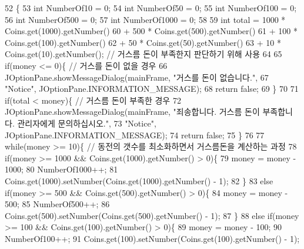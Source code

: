 \begin{DoxyCode}
52                                            \{
53         \textcolor{keywordtype}{int} NumberOf10 = 0;
54         \textcolor{keywordtype}{int} NumberOf50 = 0;
55         \textcolor{keywordtype}{int} NumberOf100 = 0;
56         \textcolor{keywordtype}{int} NumberOf500 = 0;
57         \textcolor{keywordtype}{int} NumberOf1000 = 0;
58         
59         \textcolor{keywordtype}{int} total = 1000 * Coins.get(1000).getNumber()
60                     + 500 * Coins.get(500).getNumber()
61                     + 100 * Coins.get(100).getNumber()
62                     + 50 * Coins.get(50).getNumber()
63                     + 10 * Coins.get(10).getNumber();  \textcolor{comment}{// 거스름 돈이 부족한지 판단하기 위해 사용}
64         
65         \textcolor{keywordflow}{if}(money <= 0)\{  \textcolor{comment}{// 거스를 돈이 없을 경우}
66             JOptionPane.showMessageDialog(mainFrame, \textcolor{stringliteral}{"거스를 돈이 없습니다."},
67                     \textcolor{stringliteral}{"Notice"}, JOptionPane.INFORMATION\_MESSAGE);
68             \textcolor{keywordflow}{return} \textcolor{keyword}{false};
69         \}
70         
71         \textcolor{keywordflow}{if}(total < money)\{  \textcolor{comment}{// 거스름 돈이 부족한 경우}
72             JOptionPane.showMessageDialog(mainFrame, \textcolor{stringliteral}{"죄송합니다. 거스름 돈이 부족합니다. 관리자에게 문의하십시오."},
73                     \textcolor{stringliteral}{"Notice"}, JOptionPane.INFORMATION\_MESSAGE);
74             \textcolor{keywordflow}{return} \textcolor{keyword}{false};
75         \}
76         
77         \textcolor{keywordflow}{while}(money >= 10)\{  \textcolor{comment}{// 동전의 갯수를 최소화하면서 거스름돈을 계산하는 과정}
78             \textcolor{keywordflow}{if}(money >= 1000 && Coins.get(1000).getNumber() > 0)\{
79                 money = money - 1000;
80                 NumberOf1000++;
81                 Coins.get(1000).setNumber(Coins.get(1000).getNumber() - 1);
82             \}
83             \textcolor{keywordflow}{else} \textcolor{keywordflow}{if}(money >= 500 && Coins.get(500).getNumber() > 0)\{
84                 money = money - 500;
85                 NumberOf500++;
86                 Coins.get(500).setNumber(Coins.get(500).getNumber() - 1);
87             \}
88             \textcolor{keywordflow}{else} \textcolor{keywordflow}{if}(money >= 100 && Coins.get(100).getNumber() > 0)\{
89                 money = money - 100;
90                 NumberOf100++;
91                 Coins.get(100).setNumber(Coins.get(100).getNumber() - 1);

\end{DoxyCode}
